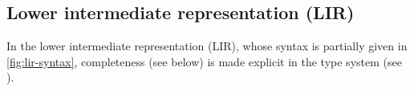 \documentclass[index.tex]{subfiles}
\begin{document}
\newcommand{\EWrapIntoNI}[1]{\ensuremath{\SyWrap^{\CNI}~ #1}}
\newcommand{\EWrapIntoII}[1]{\ensuremath{\SyWrap^{\CII}~ #1}}
\newcommand{\EEmbed}[1]{\ensuremath{\SyEmbed~ #1}}
\newcommand{\EProj}[2]{\ensuremath{\SyProj[#2]~ #1}}

\newcommand{\EPlus}[2]{\ensuremath{#1 \SyPlus #2}}
\newcommand{\ETimes}[2]{\ensuremath{#1 \SyTimes #2}}
\newcommand{\EFPlus}[2]{\ensuremath{#1 \SyFPlus #2}}
\newcommand{\EFTimes}[2]{\ensuremath{#1 \SyFTimes #2}}

\newcommand{\ETrue}{\ensuremath{\SyTrue}}
\newcommand{\EAnd}[2]{\ensuremath{#1 \SyAnd #2}}
\newcommand{\EOr}[2]{\ensuremath{#1 \SyOr #2}}

\newcommand{\EPair}[2]{\ensuremath{(#1, #2)}}
\newcommand{\EProjL}[1]{\ensuremath{\SyProjL~ #1}}
\newcommand{\EProjR}[1]{\ensuremath{\SyProjR~ #1}}

\newcommand{\EFun}[3]{\ensuremath{\SyFun #1 : #2 \SyDot~ #3}}

\newcommand{\EEHole}[2]{\ensuremath{\SyEHole{#1}{#2}}}

\newcommand{\EVarNamed}[2]{\ensuremath{t_{#1}^{{\color{gray}#2}}}}

\subsection{Lower intermediate representation (LIR)}
\label{sec:lir}

In the lower intermediate representation (LIR), whose syntax is partially given in
\cref{fig:lir-syntax}, completeness (see below) is made explicit in the type system
(see ).
\end{document}
